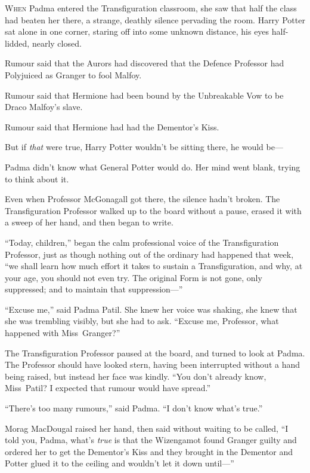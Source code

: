 
\lettrine{W}{hen} Padma entered the Transfiguration classroom, she saw that half the class had beaten her there, a strange, deathly silence pervading the room. Harry Potter sat alone in one corner, staring off into some unknown distance, his eyes half-lidded, nearly closed.

Rumour said that the Aurors had discovered that the Defence Professor had Polyjuiced as Granger to fool Malfoy.

Rumour said that Hermione had been bound by the Unbreakable Vow to be Draco Malfoy’s slave.

Rumour said that Hermione had had the Dementor’s Kiss.

But if \emph{that} were true, Harry Potter wouldn’t be sitting there, he would be—

Padma didn’t know what General Potter would do. Her mind went blank, trying to think about it.

Even when Professor McGonagall got there, the silence hadn’t broken. The Transfiguration Professor walked up to the board without a pause, erased it with a sweep of her hand, and then began to write.

“Today, children,” began the calm professional voice of the Transfiguration Professor, just as though nothing out of the ordinary had happened that week, “we shall learn how much effort it takes to sustain a Transfiguration, and why, at your age, you should not even try. The original Form is not gone, only suppressed; and to maintain that suppression—”

“Excuse me,” said Padma Patil. She knew her voice was shaking, she knew that she was trembling visibly, but she had to ask.
“Excuse me, Professor, what happened with Miss~Granger?”

The Transfiguration Professor paused at the board, and turned to look at Padma. The Professor should have looked stern, having been interrupted without a hand being raised, but instead her face was kindly.
“You don’t already know, Miss~Patil? I expected that rumour would have spread.”

“There’s too many rumours,” said Padma.
“I don’t know what’s true.”

Morag MacDougal raised her hand, then said without waiting to be called,
“I told you, Padma, what’s \emph{true} is that the Wizengamot found Granger guilty and ordered her to get the Dementor’s Kiss and they brought in the Dementor and Potter glued it to the ceiling and wouldn’t let it down until—”


